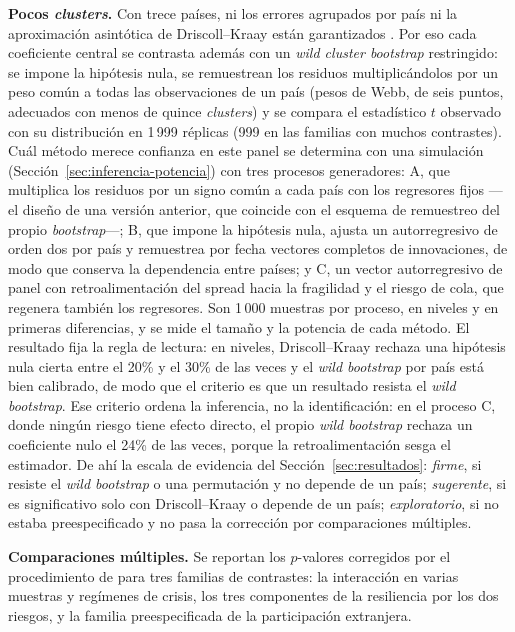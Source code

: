 \textbf{Pocos \textit{clusters}.} Con trece países, ni los errores agrupados por país ni la aproximación asintótica de Driscoll--Kraay están garantizados \citep{CameronGelbachMiller2008}. Por eso cada coeficiente central se contrasta además con un \textit{wild cluster bootstrap} restringido: se impone la hipótesis nula, se remuestrean los residuos multiplicándolos por un peso común a todas las observaciones de un país (pesos de Webb, de seis puntos, adecuados con menos de quince \textit{clusters}) y se compara el estadístico $t$ observado con su distribución en 1\,999 réplicas (999 en las familias con muchos contrastes). Cuál método merece confianza en este panel se determina con una simulación (Sección~\ref{sec:inferencia-potencia}) con tres procesos generadores: A, que multiplica los residuos por un signo común a cada país con los regresores fijos ---el diseño de una versión anterior, que coincide con el esquema de remuestreo del propio \textit{bootstrap}---; B, que impone la hipótesis nula, ajusta un autorregresivo de orden dos por país y remuestrea por fecha vectores completos de innovaciones, de modo que conserva la dependencia entre países; y C, un vector autorregresivo de panel con retroalimentación del spread hacia la fragilidad y el riesgo de cola, que regenera también los regresores. Son 1\,000 muestras por proceso, en niveles y en primeras diferencias, y se mide el tamaño y la potencia de cada método. El resultado fija la regla de lectura: en niveles, Driscoll--Kraay rechaza una hipótesis nula cierta entre el 20\% y el 30\% de las veces y el \textit{wild bootstrap} por país está bien calibrado, de modo que el criterio es que un resultado resista el \textit{wild bootstrap}. Ese criterio ordena la inferencia, no la identificación: en el proceso C, donde ningún riesgo tiene efecto directo, el propio \textit{wild bootstrap} rechaza un coeficiente nulo el 24\% de las veces, porque la retroalimentación sesga el estimador. De ahí la escala de evidencia del Sección~\ref{sec:resultados}: \emph{firme}, si resiste el \textit{wild bootstrap} o una permutación y no depende de un país; \emph{sugerente}, si es significativo solo con Driscoll--Kraay o depende de un país; \emph{exploratorio}, si no estaba preespecificado y no pasa la corrección por comparaciones múltiples.

\textbf{Comparaciones múltiples.} Se reportan los $p$-valores corregidos por el procedimiento de \citet{Holm1979} para tres familias de contrastes: la interacción en varias muestras y regímenes de crisis, los tres componentes de la resiliencia por los dos riesgos, y la familia preespecificada de la participación extranjera.

